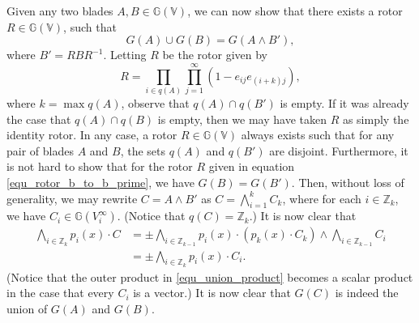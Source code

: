 \documentclass{birkjour}
\theoremstyle{definition}
\theoremstyle{remark}
\numberwithin{equation}{section}
\newcommand{\G}{\mathbb{G}}
\newcommand{\V}{\mathbb{V}}
\newcommand{\Z}{\mathbb{Z}}
\begin{document}
Given any two blades $A,B\in\G(\V)$, we can now show that
there exists a rotor $R\in\G(\V)$, such that
\begin{equation}
G(A)\cup G(B)=G(A\wedge B'),
\end{equation}
where $B'=RBR^{-1}$.  Letting $R$ be the rotor given by
\begin{equation}\label{equ_rotor_b_to_b_prime}
R = \prod_{i\in q(A)}\prod_{j=1}^\infty(1-e_{ij}e_{(i+k)j}),
\end{equation}
where $k=\max q(A)$, observe that $q(A)\cap q(B')$ is empty.
If it was already the case that $q(A)\cap q(B)$ is empty, then we may have taken
$R$ as simply the identity rotor.  In any case, a rotor $R\in\G(\V)$ always exists
such that for any pair of blades $A$ and $B$, the sets $q(A)$ and $q(B')$ are disjoint.
Furthermore, it is not hard to show that for the rotor $R$ given
in equation \eqref{equ_rotor_b_to_b_prime}, we have $G(B)=G(B')$.  Then, without loss of generality,
we may rewrite $C=A\wedge B'$ as $C=\bigwedge_{i=1}^k C_k$, where for
each $i\in\Z_k$, we have $C_i\in\G(V_i^\infty)$.
(Notice that $q(C)=\Z_k$.)
It is now clear that
\begin{align}
\bigwedge_{i\in\Z_k} p_i(x)\cdot C &= \pm\bigwedge_{i\in\Z_{k-1}} p_i(x)\cdot
(p_k(x)\cdot C_k)\wedge\bigwedge_{i\in\Z_{k-1}} C_i \\
 &= \pm\bigwedge_{i\in\Z_k}p_i(x)\cdot C_i.\label{equ_union_product}
\end{align}
(Notice that the outer product in \eqref{equ_union_product} becomes
a scalar product in the case that every $C_i$ is a vector.)
It is now clear that $G(C)$ is indeed the union of $G(A)$ and $G(B)$.
\end{document}

